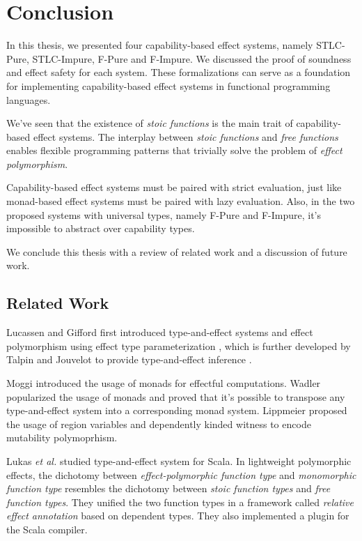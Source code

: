 \section{Conclusion}

In this thesis, we presented four capability-based effect systems,
namely STLC-Pure, STLC-Impure, F-Pure and F-Impure. We discussed the
proof of soundness and effect safety for each system. These
formalizations can serve as a foundation for implementing
capability-based effect systems in functional programming languages.

We've seen that the existence of \emph{stoic functions} is the main
trait of capability-based effect systems. The interplay between
\emph{stoic functions} and \emph{free functions} enables flexible
programming patterns that trivially solve the problem of \emph{effect
  polymorphism}.

Capability-based effect systems must be paired with strict evaluation,
just like monad-based effect systems must be paired with lazy
evaluation. Also, in the two proposed systems with universal types,
namely F-Pure and F-Impure, it's impossible to abstract over
capability types.

We conclude this thesis with a review of related work and a discussion
of future work.

\subsection{Related Work}

Lucassen and Gifford first introduced type-and-effect
systems\cite{gifford1986integrating} and effect polymorphism using
effect type parameterization \cite{lucassen1988polymorphic}, which is
further developed by Talpin and Jouvelot to provide type-and-effect
inference \cite{talpin1992polymorphic, talpin1994type}.

Moggi introduced the usage of monads for effectful
computations\cite{moggi1991notions}. Wadler popularized the usage of
monads\cite{wadler1992comprehending, wadler1995monads} and proved that
it's possible to transpose any type-and-effect system into a
corresponding monad system\cite{wadler2003marriage}. Lippmeier
proposed the usage of region variables and dependently kinded witness
to encode mutability polymoprhism\cite{lippmeier2009witnessing}.

Lukas \emph{et al.}  studied type-and-effect system for
Scala\cite{rytz2012lightweight, rytz2013flow, lukas2014effect}.  In
lightweight polymorphic effects\cite{rytz2012lightweight}, the
dichotomy between \emph{effect-polymorphic function type} and
\emph{monomorphic function type} resembles the dichotomy between
\emph{stoic function types} and \emph{free function types}.  They
unified the two function types in a framework called \emph{relative
  effect annotation} based on dependent types. They also implemented a
plugin for the Scala compiler.

